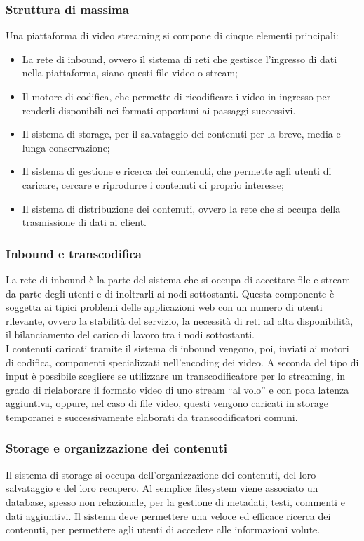 		\subsubsection{Struttura di massima}
			Una piattaforma di video streaming si compone di cinque elementi principali:
			\begin{itemize}
			\item La rete di inbound, ovvero il sistema di reti che gestisce l'ingresso di dati nella piattaforma, siano questi file video o stream;
			\item Il motore di codifica, che permette di ricodificare i video in ingresso per renderli disponibili nei formati opportuni ai passaggi successivi.
			\item Il sistema di storage, per il salvataggio dei contenuti per la breve, media e lunga conservazione;
			\item Il sistema di gestione e ricerca dei contenuti, che permette agli utenti di caricare, cercare e riprodurre i contenuti di proprio interesse;
			\item Il sistema di distribuzione dei contenuti, ovvero la rete che si occupa della trasmissione di dati ai client.
			\end{itemize}

		\subsubsection{Inbound e transcodifica}
			La rete di inbound è la parte del sistema che si occupa di accettare file e stream da parte degli utenti e di inoltrarli ai nodi sottostanti. Questa componente è soggetta ai tipici problemi delle applicazioni web con un numero di utenti rilevante, ovvero la stabilità del servizio, la necessità di reti ad alta disponibilità, il bilanciamento del carico di lavoro tra i nodi sottostanti.
			\\
			I contenuti caricati tramite il sistema di inbound vengono, poi, inviati ai motori di codifica, componenti specializzati nell'encoding dei video. A seconda del tipo di input è possibile scegliere se utilizzare un transcodificatore per lo streaming, in grado di rielaborare il formato video di uno stream ``al volo'' e con poca latenza aggiuntiva, oppure, nel caso di file video, questi vengono caricati in storage temporanei e successivamente elaborati da transcodificatori comuni.

		\subsubsection{Storage e organizzazione dei contenuti}
			Il sistema di storage si occupa dell'organizzazione dei contenuti, del loro salvataggio e del loro recupero. Al semplice filesystem viene associato un database, spesso non relazionale, per la gestione di metadati, testi, commenti e dati aggiuntivi. Il sistema deve permettere una veloce ed efficace ricerca dei contenuti, per permettere agli utenti di accedere alle informazioni volute.

